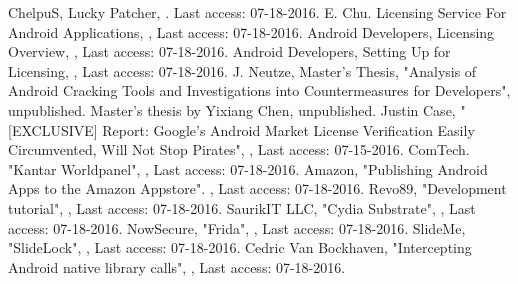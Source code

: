 \documentclass{sig-alternate}
\begin{document}
%
%
%
\begin{thebibliography}{99}
 ChelpuS, Lucky Patcher, . Last access: 07-18-2016.
 E. Chu. Licensing Service For Android Applications, , Last access: 07-18-2016.
 Android Developers, Licensing Overview, , Last access: 07-18-2016.
 Android Developers, Setting Up for Licensing, , Last access: 07-18-2016.
 J. Neutze, Master's Thesis, "Analysis of Android Cracking Tools and Investigations into Countermeasures for Developers", unpublished.
 Master's thesis by Yixiang Chen, unpublished.
Justin Case, "[EXCLUSIVE] Report: Google's Android Market License Verification Easily Circumvented, Will Not Stop Pirates", , Last access: 07-15-2016.
ComTech. "Kantar Worldpanel", , Last access: 07-18-2016.
Amazon, "Publishing Android Apps to the Amazon Appstore". , Last access: 07-18-2016.
Revo89, "Development tutorial", , Last access: 07-18-2016.
SaurikIT LLC, "Cydia Substrate", , Last access: 07-18-2016.
NowSecure, "Frida", , Last access: 07-18-2016.
SlideMe, "SlideLock", , Last access: 07-18-2016.
Cedric Van Bockhaven, "Intercepting Android native library calls", , Last access: 07-18-2016.

\end{thebibliography}
\end{document}

